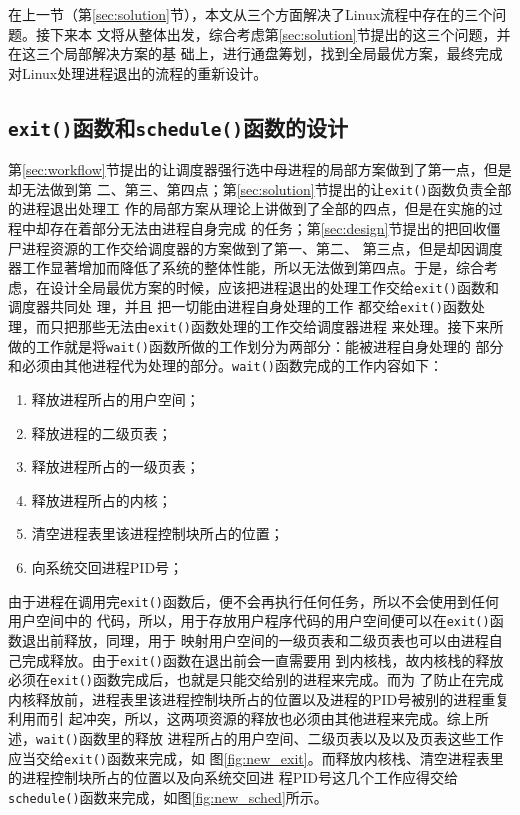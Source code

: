 \documentclass{swfuthesism}
\begin{document}
在上一节（第\ref{sec:solution}节），本文从三个方面解决了Linux流程中存在的三个问题。接下来本
文将从整体出发，综合考虑第\ref{sec:solution}节提出的这三个问题，并在这三个局部解决方案的基
础上，进行通盘筹划，找到全局最优方案，最终完成对Linux处理进程退出的流程的重新设计。

\subsection{\texttt{exit()}函数和\texttt{schedule()}函数的设计}
\label{sec:exit-sched}

第\ref{sec:workflow}节提出的让调度器强行选中母进程的局部方案做到了第一点，但是却无法做到第
二、第三、第四点；第\ref{sec:solution}节提出的让\texttt{exit()}函数负责全部的进程退出处理工
作的局部方案从理论上讲做到了全部的四点，但是在实施的过程中却存在着部分无法由进程自身完成
的任务；第\ref{sec:design}节提出的把回收僵尸进程资源的工作交给调度器的方案做到了第一、第二、
第三点，但是却因调度器工作显著增加而降低了系统的整体性能，所以无法做到第四点。于是，综合考
虑，在设计全局最优方案的时候，应该把进程退出的处理工作交给\texttt{exit()}函数和调度器共同处
理，并且%
把一切能由进程自身处理的工作
都交给\texttt{exit()}函数处理，而只把那些无法由\texttt{exit()}函数处理的工作交给调度器进程
来处理。接下来所做的工作就是将\texttt{wait()}函数所做的工作划分为两部分：能被进程自身处理的
部分和必须由其他进程代为处理的部分。\texttt{wait()}函数完成的工作内容如下：

\begin{enumerate}
\item 释放进程所占的用户空间；
\item 释放进程的二级页表；
\item 释放进程所占的一级页表；
\item 释放进程所占的内核；
\item 清空进程表里该进程控制块所占的位置；
\item 向系统交回进程PID号；
\end{enumerate}

由于进程在调用完\texttt{exit()}函数后，便不会再执行任何任务，所以不会使用到任何用户空间中的
代码，所以，用于存放用户程序代码的用户空间便可以在\texttt{exit()}函数退出前释放，同理，用于
映射用户空间的一级页表和二级页表也可以由进程自己完成释放。由于\texttt{exit()}函数在退出前会一直需要用
到内核栈，故内核栈的释放必须在\texttt{exit()}函数完成后，也就是只能交给别的进程来完成。而为
了防止在完成内核释放前，进程表里该进程控制块所占的位置以及进程的PID号被别的进程重复利用而引
起冲突，所以，这两项资源的释放也必须由其他进程来完成。综上所述，\texttt{wait()}函数里的释放
进程所占的用户空间、二级页表以及以及页表这些工作应当交给\texttt{exit()}函数来完成，如
图\ref{fig:new_exit}。而释放内核栈、清空进程表里的进程控制块所占的位置以及向系统交回进
程PID号这几个工作应得交给\texttt{schedule()}函数来完成，如图\ref{fig:new_sched}所示。
\end{document}
